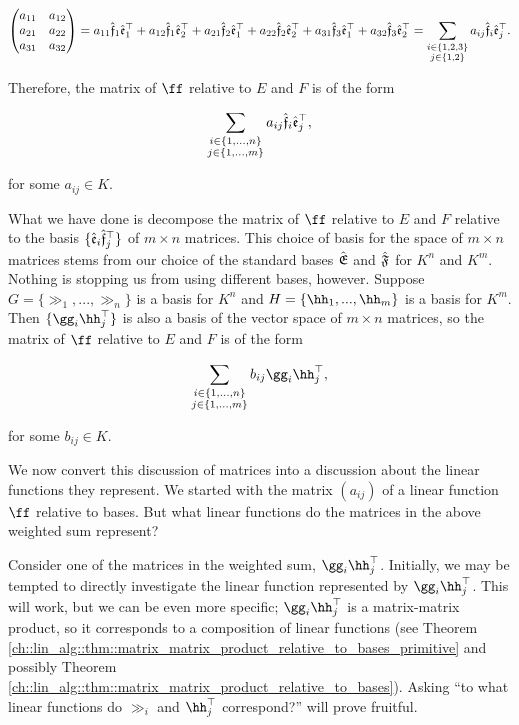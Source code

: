 \begin{align*}
    \begin{pmatrix}
        a_{11} & a_{12} \\
        a_{21} & a_{22} \\
        a_{31} & a_{32}
    \end{pmatrix}
    =
    a_{11} \hat{\mathfrak{f}}_1 \hat{\mathfrak{e}}_1^\top + a_{12} \hat{\mathfrak{f}}_1 \hat{\mathfrak{e}}_2^\top 
    + a_{21} \hat{\mathfrak{f}}_2 \hat{\mathfrak{e}}_1^\top + a_{22} \hat{\mathfrak{f}}_2 \hat{\mathfrak{e}}_2^\top +
    a_{31} \hat{\mathfrak{f}}_3 \hat{\mathfrak{e}}_1^\top + a_{32} \hat{\mathfrak{f}}_3 \hat{\mathfrak{e}}_2^\top
    = \sum_{\substack{i \in \{1, 2, 3\} \\ j \in \{1, 2\}}} a_{ij} \hat{\mathfrak{f}}_i \hat{\mathfrak{e}}_j^\top.
\end{align*}

Therefore, the matrix of $\ff$ relative to $E$ and $F$ is of the form

\begin{align*}
    \sum_{\substack{i \in \{1, ..., n\} \\ j \in \{1, ..., m\}}} a_{ij} \hat{\mathfrak{f}}_i \hat{\mathfrak{e}}_j^\top,
\end{align*}

for some $a_{ij} \in K$.

What we have done is decompose the matrix of $\ff$ relative to $E$ and $F$ relative to the basis $\{ \hat{\mathfrak{e}}_i \hat{\mathfrak{f}}_j^\top \}$ of $m \times n$ matrices. This choice of basis for the space of $m \times n$ matrices stems from our choice of the standard bases ${\hat{\mathfrak{E}}}$ and ${\hat{\mathfrak{F}}}$ for $K^n$ and $K^m$. Nothing is stopping us from using different bases, however. Suppose $G = \{\gg_1, ..., \gg_n\}$ is a basis for $K^n$ and $H = \{\hh_1, ..., \hh_m\}$ is a basis for $K^m$. Then $\{ \gg_i \hh_j^\top \}$ is also a basis of the vector space of $m \times n$ matrices, so the matrix of $\ff$ relative to $E$ and $F$ is of the form

\begin{align*}
    \sum_{\substack{i \in \{1, ..., n\} \\ j \in \{1, ..., m\}}} b_{ij} \gg_i \hh_j^\top,
\end{align*}

for some $b_{ij} \in K$.

We now convert this discussion of matrices into a discussion about the linear functions they represent. We started with the matrix $(a_{ij})$ of a linear function $\ff$ relative to bases. But what linear functions do the matrices in the above weighted sum represent? 

Consider one of the matrices in the weighted sum, $\gg_i \hh_j^\top$. Initially, we may be tempted to directly investigate the linear function represented by $\gg_i \hh_j^\top$. This will work, but we can be even more specific; $\gg_i \hh_j^\top$ is a matrix-matrix product, so it corresponds to a composition of linear functions (see Theorem \ref{ch::lin_alg::thm::matrix_matrix_product_relative_to_bases_primitive} and possibly Theorem \ref{ch::lin_alg::thm::matrix_matrix_product_relative_to_bases}). Asking ``to what linear functions do $\gg_i$ and $\hh_j^\top$ correspond?'' will prove fruitful.

